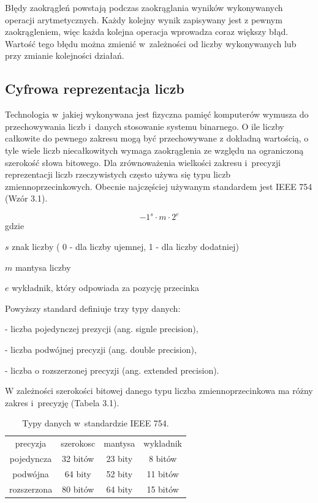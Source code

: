 Błędy zaokrągleń powstają podczas zaokrąglania wyników wykonywanych operacji arytmetycznych. Każdy kolejny wynik zapisywany jest z pewnym zaokrągleniem, więc każda kolejna operacja wprowadza coraz większy błąd. Wartość tego błędu można zmienić w~zależności od liczby wykonywanych lub przy zmianie kolejności działań. 

\subsection{Cyfrowa reprezentacja liczb}\label{sec:numera}

Technologia w~jakiej wykonywana jest fizyczna pamięć komputerów wymusza do przechowywania liczb i~danych stosowanie systemu binarnego. O ile liczby całkowite do pewnego zakresu mogą być przechowywane z dokładną wartością, o tyle wiele liczb niecałkowitych wymaga zaokrąglenia ze względu na ograniczoną szerokość słowa bitowego. Dla zrównoważenia wielkości zakresu i~precyzji reprezentacji liczb rzeczywistych często używa się typu liczb zmiennoprzecinkowych. Obecnie najczęściej używanym standardem jest IEEE 754 (Wzór 3.1).

\begin{equation}
-1^s\cdot m \cdot 2^e
\end{equation}
gdzie
\begin{eqwhere}[2cm]
        \item[$s$]znak liczby ( 0 - dla liczby ujemnej, 1 - dla liczby dodatniej)
        \item[$m$] mantysa liczby
        \item[$e$] wykładnik, który odpowiada za pozycję przecinka 
\end{eqwhere}

Powyższy standard definiuje trzy typy danych:

- liczba pojedynczej prezycji (ang. signle precision),

- liczba podwójnej precyzji (ang. double precision),

- liczba o rozszerzonej precyzji (ang. extended precision).

W zależności szerokości bitowej danego typu liczba zmiennoprzecinkowa ma różny zakres i~precyzję (Tabela 3.1).

\begin{table}[h]
        \centering
        \begin{threeparttable}
                \caption{Typy danych w~standardzie IEEE 754.}\label{tab:table_exampleaz}
                \begin{tabularx}{0.6\textwidth}{| c | c | c | c |}
                        \midrule
                        	precyzja	&	szerokosc & mantysa & wykladnik \\
		pojedyncza  & 32 bitów & 23 bity & 8 bitów \\
                        podwójna  & 64 bity & 52 bity & 11 bitów \\
		rozszerzona & 80 bitów & 64 bity & 15 bitów \\
                        \bottomrule
                \end{tabularx}
        \end{threeparttable}
\end{table}

